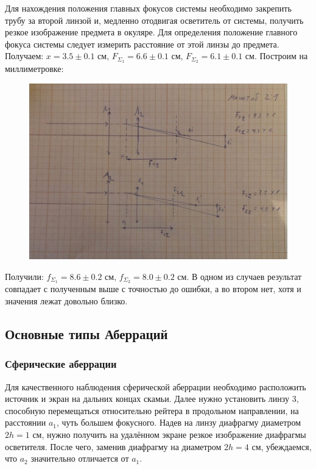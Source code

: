 \documentclass[a4paper,12pt]{article}
\begin{document}
Для нахождения положения главных фокусов системы необходимо закрепить  трубу за второй линзой и,
медленно отодвигая осветитель от системы,  получить резкое изображение предмета в окуляре. Для определения  положение главного фокуса системы  следует измерить расстояние от этой линзы до предмета. Получаем: $x = 3.5\pm 0.1$ см, $F_{\Sigma_1} =6.6 \pm 0.1$ см, $F_{\Sigma_2} = 6.1\pm 0.1$ см.
Построим на миллиметровке:
\begin{center}
	\begin{figure}[bhtp!]
		\centering
		\includegraphics[width=14 cm]{kD3aQ9ZTqlE.jpg}
	\end{figure}
\end{center}
Получили: $f_{\Sigma_1}=8.6\pm0.2$ см, $f_{\Sigma_2}=8.0\pm0.2$ см.  В одном из случаев результат совпадает с полученным выше с точностью до ошибки, а во втором нет, хотя и значения лежат довольно близко.


\subsection*{Основные типы Аберраций}


 \subsubsection*{Сферические аберрации} Для качественного наблюдения сферической аберрации необходимо расположить источник и экран на дальних концах скамьи. Далее нужно установить линзу $3$, способную перемещаться относительно рейтера в продольном направлении, на расстоянии $a_1$, чуть большем фокусного. Надев на линзу диафрагму диаметром $2h = 1$ см, нужно получить на удалённом экране резкое изображение диафрагмы осветителя. После чего, заменив диафрагму на диаметром $2h = 4$ см, убеждаемся, что $a_2$ значительно отличается от $a_1$.
 
\end{document}

